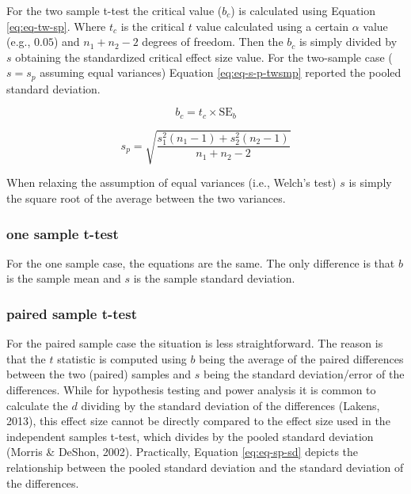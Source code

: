 \documentclass[
  man]{apa7}
\begin{document}
For the two sample t-test the critical value (\(b_c\)) is calculated using Equation \eqref{eq:eq-tw-sp}. Where \(t_c\) is the critical \(t\) value calculated using a certain \(\alpha\) value (e.g., \(0.05\)) and \(n_1 + n_2 - 2\) degrees of freedom. Then the \(b_c\) is simply divided by \(s\) obtaining the standardized critical effect size value. For the two-sample case (\(s = s_p\) assuming equal variances) Equation \eqref{eq:eq-s-p-twsmp} reported the pooled standard deviation.

\begin{equation}
    \label{eq:eq-tw-sp}
    b_c = t_c \times \text{SE}_{b}
\end{equation}

\begin{equation}
    \label{eq:eq-s-p-twsmp}
    s_p = \sqrt{\frac{s_1^2 (n_1 - 1) + s_2^2 (n_2 - 1)}{n_1 + n_2 - 2}}
\end{equation}

When relaxing the assumption of equal variances (i.e., Welch's test) \(s\) is simply the square root of the average between the two variances.

\subsubsection{one sample t-test}\label{one-sample-t-test}

For the one sample case, the equations are the same. The only difference is that \(b\) is the sample mean and \(s\) is the sample standard deviation.

\subsubsection{paired sample t-test}\label{paired-sample-t-test}

For the paired sample case the situation is less straightforward. The reason is that the \(t\) statistic is computed using \(b\) being the average of the paired differences between the two (paired) samples and \(s\) being the standard deviation/error of the differences. While for hypothesis testing and power analysis it is common to calculate the \(d\) dividing by the standard deviation of the differences (Lakens, 2013), this effect size cannot be directly compared to the effect size used in the independent samples t-test, which divides by the pooled standard deviation (Morris \& DeShon, 2002). Practically, Equation \eqref{eq:eq-sp-sd} depicts the relationship between the pooled standard deviation and the standard deviation of the differences.
\end{document}
